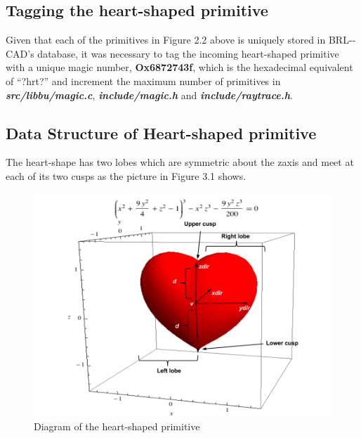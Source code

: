 \subsection{Tagging the heart­-shaped primitive}

Given   that   each   of   the   primitives   in   Figure   2.2   above   is   uniquely   stored   in  
BRL-­CAD's   database,   it   was   necessary   to   tag   the   incoming   heart-­shaped  
primitive   with   a   unique   magic   number,   \textbf{Ox6872743f},   which   is   the   hexadecimal  
equivalent   of   “?hrt?”   and   increment   the   maximum   number   of   primitives   in  
\textbf{\textit{src/libbu/magic.c}}, \textbf{\textit{include/magic.h}} and \textbf{\textit{include/raytrace.h}}.  

\subsection{Data Structure of Heart-shaped primitive }

\hspace{30} The   heart-­shape   has   two   lobes   which   are   symmetric   about   the   z­axis   and  
meet at each of its two cusps as the picture in Figure 3.1 shows.  

\begin{figure}[htbp]
\centering
\includegraphics[trim=0.0cm 0.5cm 0.1cm 0.1cm, clip=true, totalheight=0.37\textheight]{Pictures/Heart.png}
\caption[Diagram of the heart-shaped primitive]{Diagram of the heart-shaped primitive}
\label{Heart}
\end{figure}

